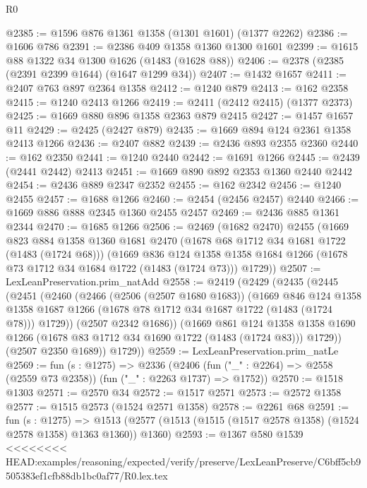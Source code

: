 \begin{lexlean}{R0}
\begin{coremodule}
{{{{{{{{{{{{{{{{{{{{{{{{{{{{{{{{{{{{{{{{{{{{{{{{{{{{{{{{{{{{{{{{{{{{{{{{{{{{{{{{{{{{{{@2385 := @1596 @876 @1361 @1358 (@1301 @1601) (@1377 @2262)
@2386 := @1606 @786
@2391 := @2386 @409 @1358 @1360 @1300 @1601
@2399 := @1615 @88 @1322 @34 @1300 @1626 (@1483 (@1628 @88))
@2406 := @2378 (@2385 (@2391 @2399 @1644) (@1647 @1299 @34))
@2407 := @1432 @1657
@2411 := @2407 @763 @897 @2364 @1358
@2412 := @1240 @879
@2413 := @162 @2358
@2415 := @1240 @2413 @1266
@2419 := @2411 (@2412 @2415) (@1377 @2373)
@2425 := @1669 @880 @896 @1358 @2363 @879 @2415
@2427 := @1457 @1657 @11
@2429 := @2425 (@2427 @879)
@2435 := @1669 @894 @124 @2361 @1358 @2413 @1266
@2436 := @2407 @882
@2439 := @2436 @893 @2355 @2360
@2440 := @162 @2350
@2441 := @1240 @2440
@2442 := @1691 @1266
@2445 := @2439 (@2441 @2442) @2413
@2451 := @1669 @890 @892 @2353 @1360 @2440 @2442
@2454 := @2436 @889 @2347 @2352
@2455 := @162 @2342
@2456 := @1240 @2455
@2457 := @1688 @1266
@2460 := @2454 (@2456 @2457) @2440
@2466 := @1669 @886 @888 @2345 @1360 @2455 @2457
@2469 := @2436 @885 @1361 @2344
@2470 := @1685 @1266
@2506 := @2469
    (@1682 @2470)
    @2455
    (@1669
      @823
      @884
      @1358
      @1360
      @1681
      @2470
      (@1678 @68 @1712 @34 @1681 @1722 (@1483 (@1724 @68)))
      (@1669
        @836
        @124
        @1358
        @1358
        @1684
        @1266
        (@1678 @73 @1712 @34 @1684 @1722 (@1483 (@1724 @73)))
        @1729))
@2507 := LexLeanPreservation.prim_natAdd
@2558 := @2419
    (@2429
      (@2435
        (@2445
          (@2451
            (@2460
              (@2466
                (@2506 (@2507 @1680 @1683))
                (@1669
                  @846
                  @124
                  @1358
                  @1358
                  @1687
                  @1266
                  (@1678 @78 @1712 @34 @1687 @1722 (@1483 (@1724 @78)))
                  @1729))
              (@2507 @2342 @1686))
            (@1669
              @861
              @124
              @1358
              @1358
              @1690
              @1266
              (@1678 @83 @1712 @34 @1690 @1722 (@1483 (@1724 @83)))
              @1729))
          (@2507 @2350 @1689))
        @1729))
@2559 := LexLeanPreservation.prim_natLe
@2569 := fun (s : @1275) =>
  @2336 (@2406 (fun ("_" : @2264) => @2558 (@2559 @73 @2358)) (fun ("_" : @2263 @1737) => @1752))
@2570 := @1518 @1303
@2571 := @2570 @34
@2572 := @1517 @2571
@2573 := @2572 @1358
@2577 := @1515 @2573 (@1524 @2571 @1358)
@2578 := @2261 @68
@2591 := fun (s : @1275) =>
  @1513 (@2577 (@1513 (@1515 (@1517 @2578 @1358) (@1524 @2578 @1358) @1363 @1360)) @1360)
@2593 := @1367 @580 @1539
<<<<<<<< HEAD:examples/reasoning/expected/verify/preserve/LexLeanPreserve/C6bff5cb9505383ef1cfb88db1bc0af77/R0.lex.tex
}}}}}}}}}}}}}}}}}}}}}}}}}}}}}}}}}}}}}}}}}}}}}}}}}}}}}}}}}}}}}}}}}}}}}}}}}}}}}}}}}}}}}}
\end{coremodule}
\end{lexlean}
